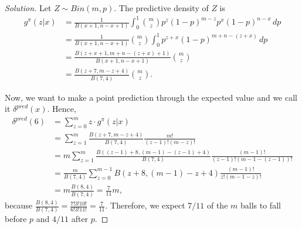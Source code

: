 \begin{proof}[Solution]
    Let $Z \sim Bin(m,p)$. The predictive density of $Z$ is
    \begin{equation*}
        \begin{split}
            g^{\pi}(z|x) &= \frac{1}{B(x+1, n-x+1)}\int_0^1 \binom{m}{z}p^z(1-p)^{m-z}p^x(1-p)^{n-x} \, dp \\
            &= \frac{1}{B(x+1, n-x+1)}\binom{m}{z}\int_0^1 p^{z+x}(1-p)^{m+n-(z+x)} \, dp \\
            &= \frac{B(z+x+1, m+n-(z+x)+1)}{B(x+1, n-x+1)}\binom{m}{z} \\
            &= \frac{B(z+7, m-z+4)}{B(7,4)}\binom{m}{z}. 
        \end{split}
    \end{equation*} 

    Now, we want to make a point prediction through the expected value and we
    call it $\delta^{pred}(x)$. Hence,  
    \begin{equation*}
        \begin{split}
            \delta^{pred}(6) &= \sum_{z=0}^m z \cdot g^{\pi}(z|x) \\
            &= \sum_{z=1}^m \frac{B(z+7, m-z+4)}{B(7,4)}\frac{m!}{(z-1)!(m-z)!} \\ 
            &= m\sum_{z=1}^m \frac{B((z-1)+8, (m-1)-(z-1)+4)}{B(7,4)}\frac{(m-1)!}{(z-1)!(m-1-(z-1))!} \\ 
            &= \frac{m}{B(7,4)}\sum_{z=0}^{m-1} B(z+8, (m-1)-z+4)\frac{(m-1)!}{z!(m-1 - z)!} \\ 
            &= m\frac{B(8,4)}{B(7,4)} = \frac{7}{11}m,
        \end{split}
    \end{equation*}
    because $\frac{B(8,4)}{B(7,4)} = \frac{7!3!10!}{6!3!11!} = \frac{7}{11}$.
    Therefore, we expect $7/11$ of the $m$ balls to fall before $p$ and $4/11$
    after $p$.
\end{proof}